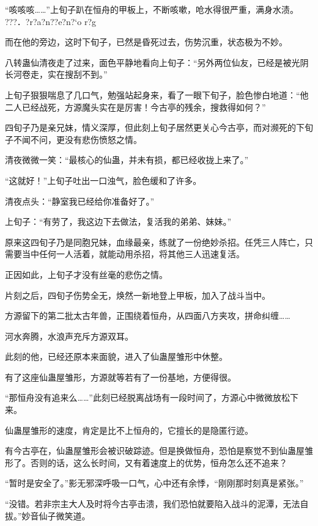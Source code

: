 
\begin{this_body}

“咳咳咳……”上旬子趴在恒舟的甲板上，不断咳嗽，呛水得很严重，满身水渍。   ???．?r?a?n??e?n?`o r?g

而在他的旁边，这时下旬子，已然是昏死过去，伤势沉重，状态极为不妙。

八转蛊仙清夜走了过来，面色平静地看向上旬子：“另外两位仙友，已经是被光阴长河卷走，实在搜刮不到。”

上旬子狠狠喘息了几口气，勉强站起身来，看了一眼下旬子，脸色惨白地道：“他二人已经战死，方源魔头实在是厉害！今古亭的残余，搜救得如何？”

四旬子乃是亲兄妹，情义深厚，但此刻上旬子居然更关心今古亭，而对濒死的下旬子不闻不问，更没有悲伤愤怒之情。

清夜微微一笑：“最核心的仙蛊，并未有损，都已经收拢上来了。”

“这就好！”上旬子吐出一口浊气，脸色缓和了许多。

清夜点头：“静室我已经给你准备好了。”

上旬子：“有劳了，我这边下去做法，复活我的弟弟、妹妹。”

原来这四旬子乃是同胞兄妹，血缘最亲，练就了一份绝妙杀招。任凭三人阵亡，只需要当中任何一人活着，就能动用杀招，将其他三人迅速复活。

正因如此，上旬子才没有丝毫的悲伤之情。

片刻之后，四旬子伤势全无，焕然一新地登上甲板，加入了战斗当中。

方源留下的第二批太古年兽，正围绕着恒舟，从四面八方夹攻，拼命纠缠……

河水奔腾，水浪声充斥方源双耳。

此刻的他，已经还原本来面貌，进入了仙蛊屋雏形中休整。

有了这座仙蛊屋雏形，方源就等若有了一份基地，方便得很。

“那恒舟没有追来么……”此刻已经脱离战场有一段时间了，方源心中微微放松下来。

仙蛊屋雏形的速度，肯定是比不上恒舟的，它擅长的是隐匿行迹。

有今古亭在，仙蛊屋雏形会被识破踪迹。但是换做恒舟，恐怕是察觉不到仙蛊屋雏形了。否则的话，这么长时间，又有着速度上的优势，恒舟怎么还不追来？

“暂时是安全了。”影无邪深呼吸一口气，心中还有余悸，“刚刚那时刻真是紧张。”

“没错。若非宗主大人及时将今古亭击溃，我们恐怕就要陷入战斗的泥潭，无法自拔。”妙音仙子微笑道。


\end{this_body}
